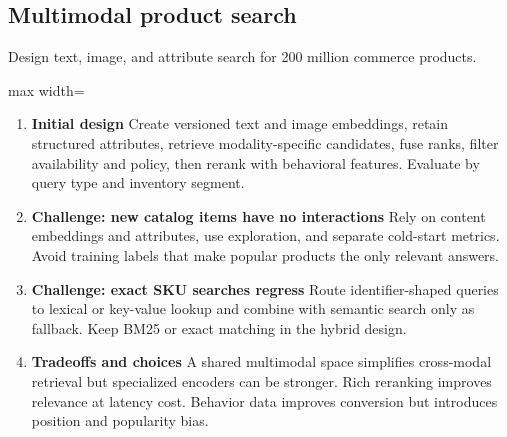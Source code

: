 \subsection{Multimodal product search}
Design text, image, and attribute search for 200 million commerce products.
\begin{center}\begin{adjustbox}{max width=\linewidth}\end{adjustbox}\end{center}
\begin{enumerate}
\item \textbf{Initial design} Create versioned text and image embeddings, retain structured attributes, retrieve modality-specific candidates, fuse ranks, filter availability and policy, then rerank with behavioral features. Evaluate by query type and inventory segment.
\item \textbf{Challenge: new catalog items have no interactions} Rely on content embeddings and attributes, use exploration, and separate cold-start metrics. Avoid training labels that make popular products the only relevant answers.
\item \textbf{Challenge: exact SKU searches regress} Route identifier-shaped queries to lexical or key-value lookup and combine with semantic search only as fallback. Keep BM25 or exact matching in the hybrid design.
\item \textbf{Tradeoffs and choices} A shared multimodal space simplifies cross-modal retrieval but specialized encoders can be stronger. Rich reranking improves relevance at latency cost. Behavior data improves conversion but introduces position and popularity bias.
\end{enumerate}
